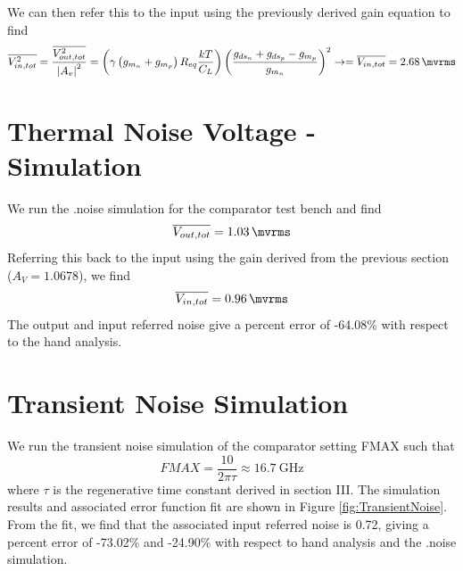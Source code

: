 \documentclass[letterpaper, notitlepage]{revtex4-1}
\begin{document}
 We can then refer this to the input using the previously derived gain equation to find
\begin{equation}
\overline{V^2_{in,tot}}=\frac{\overline{V_{out,tot}^2}}{\left|A_v\right|^2}=\left(\gamma\left(g_{m_n}+g_{m_p}\right)R_{eq}\frac{kT}{C_L}\right)\left(\frac{g_{ds_{n}}+g_{ds_{p}}-g_{m_p}}{g_{m_n}}\right)^2\rightarrow=\overline{V_{in,tot}}=\SI{2.68}{\mvrms}
\end{equation}

\section{Thermal Noise Voltage - Simulation}
We run the .noise simulation for the comparator test bench and find
\begin{equation}
\overline{V_{out,tot}}=\SI{1.03}{\mvrms}
\end{equation}
Referring this back to the input using the gain derived from the previous section ($A_V=1.0678$), we find
\begin{equation}
\overline{V_{in,tot}}=\SI{0.96}{\mvrms}
\end{equation}
The output and input referred noise give a percent error of -64.08\% with respect to the hand analysis. 

\section{Transient Noise Simulation}
We run the transient noise simulation of the comparator setting FMAX such that
\begin{equation}
FMAX=\frac{10}{2\pi\tau}\approx\SI{16.7}{\giga\hertz}
\end{equation}
where $\tau$ is the regenerative time constant derived in section III. The simulation results and associated error function fit are shown in Figure \ref{fig:TransientNoise}. From the fit, we find that the associated input referred noise is \SI{0.72}{\mvrms}, giving a percent error of -73.02\% and -24.90\% with respect to hand analysis and the .noise simulation.
\end{document}
